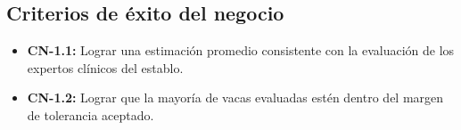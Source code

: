 \subsection{Criterios de éxito del negocio}

\begin{itemize}
  \item \textbf{CN-1.1:} Lograr una estimación promedio consistente con la evaluación de los expertos clínicos del establo.
  \item \textbf{CN-1.2:} Lograr que la mayoría de vacas evaluadas estén dentro del margen de tolerancia aceptado.
\end{itemize}
